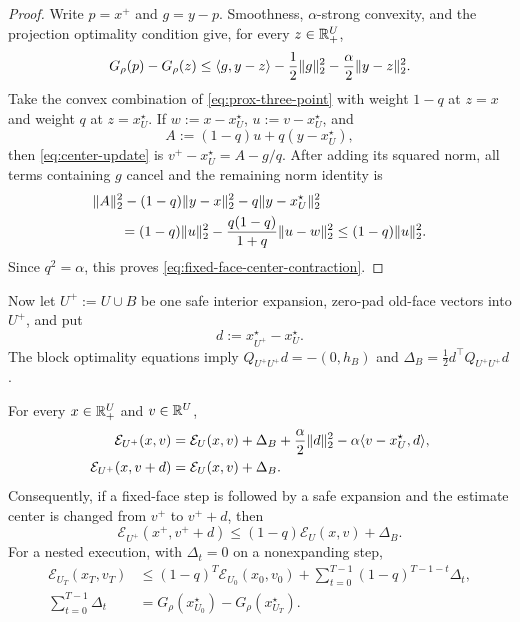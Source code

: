 \begin{proof}
Write $p=x^+$ and $g=y-p$.  Smoothness, $\alpha$-strong convexity, and the
projection optimality condition give, for every $z\in\mathbb{R}_+^U$,
\begin{equation}
 G_\rho(p)-G_\rho(z)
 \leq \langle g,y-z\rangle-\frac12\lVert g\rVert_2^2
      -\frac{\alpha}{2}\lVert y-z\rVert_2^2.
 \label{eq:prox-three-point}
\end{equation}
Take the convex combination of \cref{eq:prox-three-point} with weight
$1-q$ at $z=x$ and weight $q$ at $z=x_U^\star$.  If
$w:=x-x_U^\star$, $u:=v-x_U^\star$, and
\begin{equation*}
 A:=(1-q)u+q(y-x_U^\star),
\end{equation*}
then \cref{eq:center-update} is
$v^+-x_U^\star=A-g/q$.  After adding its squared norm, all terms containing
$g$ cancel and the remaining norm identity is
\begin{align*}
 &\lVert A\rVert_2^2
 -(1-q)\lVert y-x\rVert_2^2-q\lVert y-x_U^\star\rVert_2^2\\
 &\qquad=(1-q)\lVert u\rVert_2^2
 -\frac{q(1-q)}{1+q}\lVert u-w\rVert_2^2
 \leq(1-q)\lVert u\rVert_2^2.
\end{align*}
Since $q^2=\alpha$, this proves
\cref{eq:fixed-face-center-contraction}.
\end{proof}

Now let $U^+:=U\cup B$ be one safe interior expansion, zero-pad old-face
vectors into $U^+$, and put
\begin{equation}
 d:=x_{U^+}^\star-x_U^\star.
 \label{eq:face-optimum-shift}
\end{equation}
The block optimality equations imply
$Q_{U^+U^+}d=-(0,h_B)$ and
$\Delta_B=\frac12d^\top Q_{U^+U^+}d$.

\begin{proposition}
\label{prop:transported-schur-ledger}
For every $x\in\mathbb{R}_+^U$ and $v\in\mathbb{R}^U$,
\begin{align}
 \mathcal E_{U^+}(x,v)
 &=\mathcal E_U(x,v)+\Delta_B
   +\frac\alpha2\lVert d\rVert_2^2
   -\alpha\langle v-x_U^\star,d\rangle,
 \label{eq:zero-padded-center-defect}\\
 \mathcal E_{U^+}(x,v+d)
 &=\mathcal E_U(x,v)+\Delta_B.
 \label{eq:transported-center-identity}
\end{align}
Consequently, if a fixed-face step is followed by a safe expansion and the
estimate center is changed from $v^+$ to $v^++d$, then
\begin{equation}
 \mathcal E_{U^+}(x^+,v^++d)
 \leq(1-q)\mathcal E_U(x,v)+\Delta_B.
 \label{eq:one-expansion-transported-energy}
\end{equation}
For a nested execution, with $\Delta_t=0$ on a nonexpanding step,
\begin{align}
 \mathcal E_{U_T}(x_T,v_T)
 &\leq(1-q)^T\mathcal E_{U_0}(x_0,v_0)
   +\sum_{t=0}^{T-1}(1-q)^{T-1-t}\Delta_t,
 \label{eq:weighted-schur-ledger}\\
 \sum_{t=0}^{T-1}\Delta_t
 &=G_\rho(x_{U_0}^\star)-G_\rho(x_{U_T}^\star).
 \label{eq:transported-shock-telescope}
\end{align}
\end{proposition}

